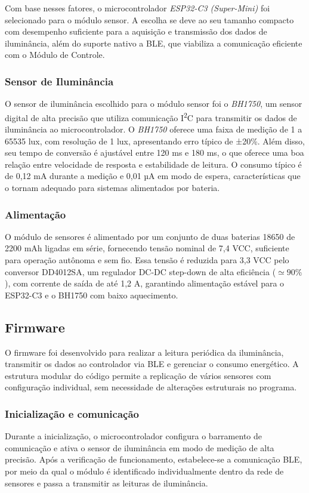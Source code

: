 Com base nesses fatores, o microcontrolador \textit{ESP32-C3 (Super-Mini)} foi selecionado para o módulo sensor. A escolha se deve ao seu tamanho compacto com desempenho suficiente para a aquisição e transmissão dos dados de iluminância, além do suporte nativo a \gls{BLE}, que viabiliza a comunicação eficiente com o Módulo de Controle.

\subsubsection{Sensor de Iluminância}

O sensor de iluminância escolhido para o módulo sensor foi o \textit{BH1750}, um sensor digital de alta precisão que utiliza comunicação I\textsuperscript{2}C para transmitir os dados de iluminância ao microcontrolador. O \textit{BH1750} oferece uma faixa de medição de 1 a 65535 lux, com resolução de 1 lux, apresentando erro típico de ±20\%. Além disso, seu tempo de conversão é ajustável entre 120 ms e 180 ms, o que oferece uma boa relação entre velocidade de resposta e estabilidade de leitura. O consumo típico é de 0,12 mA durante a medição e 0,01 µA em modo de espera, características que o tornam adequado para sistemas alimentados por bateria.

\subsubsection{Alimentação}

O módulo de sensores é alimentado por um conjunto de duas baterias 18650 de 2200 mAh ligadas em série, fornecendo tensão nominal de 7,4 VCC, suficiente para operação autônoma e sem fio. Essa tensão é reduzida para 3,3 VCC pelo conversor DD4012SA, um regulador DC-DC step-down de alta eficiência ($\simeq 90\%$), com corrente de saída de até 1,2 A, garantindo alimentação estável para o ESP32-C3 e o BH1750 com baixo aquecimento.

\subsection{Firmware}

O firmware foi desenvolvido para realizar a leitura periódica da iluminância, transmitir os dados ao controlador via BLE e gerenciar o consumo energético. A estrutura modular do código permite a replicação de vários sensores com configuração individual, sem necessidade de alterações estruturais no programa.

\subsubsection{Inicialização e comunicação}
Durante a inicialização, o microcontrolador configura o barramento de comunicação e ativa o sensor de iluminância em modo de medição de alta precisão. Após a verificação de funcionamento, estabelece-se a comunicação \gls{BLE}, por meio da qual o módulo é identificado individualmente dentro da rede de sensores e passa a transmitir as leituras de iluminância.

